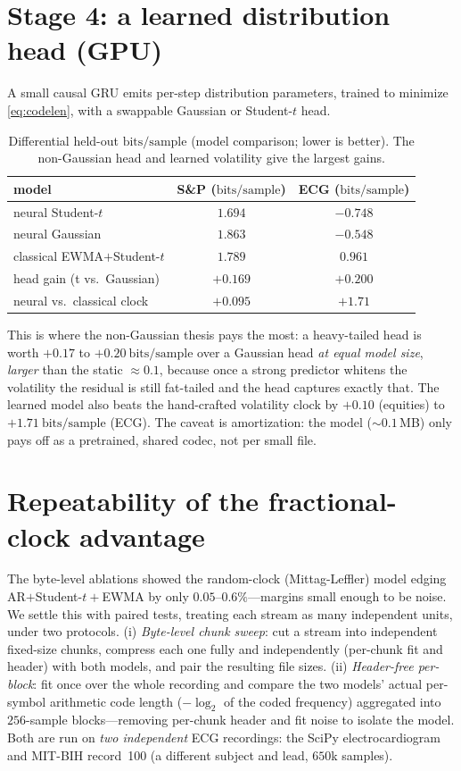 \documentclass[11pt,reqno]{amsart}
\theoremstyle{plain}
\theoremstyle{definition}
\theoremstyle{remark}
\newcommand{\bps}{\mathrm{bits/sample}}
\begin{document}
\section{Stage 4: a learned distribution head (GPU)}
\label{sec:stage4}

A small causal GRU emits per-step distribution parameters, trained to minimize
\eqref{eq:codelen}, with a swappable Gaussian or Student-$t$ head.

\begin{table}[h]
\centering\small
\begin{tabular}{lcc}
\toprule
model & S\&P ($\bps$) & ECG ($\bps$)\\
\midrule
neural Student-$t$       & $\mathbf{1.694}$ & $\mathbf{-0.748}$\\
neural Gaussian          & $1.863$ & $-0.548$\\
classical EWMA$+$Student-$t$ & $1.789$ & $0.961$\\
\midrule
head gain (t vs.\ Gaussian) & $+0.169$ & $+0.200$\\
neural vs.\ classical clock  & $+0.095$ & $+1.71$\\
\bottomrule
\end{tabular}
\caption{Differential held-out $\bps$ (model comparison; lower is better).
The non-Gaussian head and learned volatility give the largest gains.}
\label{tab:stage4}
\end{table}

This is where the non-Gaussian thesis pays the most: a heavy-tailed head is
worth $+0.17$ to $+0.20~\bps$ over a Gaussian head \emph{at equal model size},
\emph{larger} than the static $\approx0.1$, because once a strong predictor
whitens the volatility the residual is still fat-tailed and the head captures
exactly that. The learned model also beats the hand-crafted volatility clock by
$+0.10$ (equities) to $+1.71~\bps$ (ECG). The caveat is amortization: the model
($\sim0.1$\,MB) only pays off as a pretrained, shared codec, not per small file.

\section{Repeatability of the fractional-clock advantage}
\label{sec:repeat}

The byte-level ablations showed the random-clock (Mittag-Leffler) model edging
AR$+$Student-$t+$EWMA by only $0.05$--$0.6\%$---margins small enough to be noise.
We settle this with paired tests, treating each stream as many independent
units, under two protocols. (i) \emph{Byte-level chunk sweep}: cut a stream into
independent fixed-size chunks, compress each one fully and independently
(per-chunk fit and header) with both models, and pair the resulting file sizes.
(ii) \emph{Header-free per-block}: fit once over the whole recording and compare
the two models' actual per-symbol arithmetic code length ($-\log_2$ of the coded
frequency) aggregated into $256$-sample blocks---removing per-chunk header and
fit noise to isolate the model. Both are run on \emph{two independent} ECG
recordings: the SciPy electrocardiogram and MIT-BIH record~100 (a different
subject and lead, $650$k samples).
\end{document}
